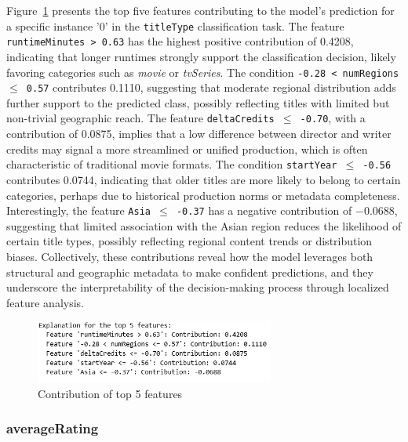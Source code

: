 Figure~\ref{fig:title_coeff} presents the top five features contributing to the model's prediction for a specific instance '0'
in the \texttt{titleType} classification task. The feature \texttt{runtimeMinutes > 0.63} has the highest positive contribution of 0.4208, 
indicating that longer runtimes strongly support the classification decision, likely favoring categories such as \textit{movie} or \textit{tvSeries}. 
The condition \texttt{-0.28 < numRegions $\leq$ 0.57} contributes 0.1110, suggesting that moderate regional distribution adds further support 
to the predicted class, possibly reflecting titles with limited but non-trivial geographic reach. 
The feature \texttt{deltaCredits $\leq$ -0.70}, with a contribution of 0.0875, implies that a low difference between director and writer credits 
may signal a more streamlined or unified production, which is often characteristic of traditional movie formats. 
The condition \texttt{startYear $\leq$ -0.56} contributes 0.0744, indicating that older titles are more likely to belong to certain categories, 
perhaps due to historical production norms or metadata completeness. Interestingly, the feature \texttt{Asia $\leq$ -0.37} 
has a negative contribution of $-0.0688$, suggesting that limited association with the Asian region reduces the likelihood of 
certain title types, possibly reflecting regional content trends or distribution biases. Collectively, these contributions reveal how the model 
leverages both structural and geographic metadata to make confident predictions, and they underscore the interpretability of the decision-making process 
through localized feature analysis.

\begin{figure}
    \centering
    \includegraphics[width=0.7\textwidth]{plotsss/title_coeff.png}
    \caption{Contribution of top 5 features}
    \label{fig:title_coeff}
\end{figure}

\subsubsection{averageRating}

